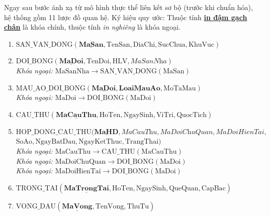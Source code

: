 Ngay sau bước ánh xạ từ mô hình thực thể liên kết sơ bộ (trước khi chuẩn hóa), hệ thống gồm 11 lược đồ quan hệ. Ký hiệu quy ước: Thuộc tính \underline{\textbf{in đậm gạch chân}} là khóa chính, thuộc tính \textit{in nghiêng} là khóa ngoại.

\begin{enumerate}
    \item $\text{SAN\_VAN\_DONG}(\underline{\mathbf{MaSan}}, \text{TenSan}, \text{DiaChi}, \text{SucChua}, \text{KhuVuc})$
    
    \item $\text{DOI\_BONG}(\underline{\mathbf{MaDoi}}, \text{TenDoi}, \text{HLV}, \textit{MaSanNha})$\\
    \textit{Khóa ngoại: $\text{MaSanNha} \rightarrow \text{SAN\_VAN\_DONG}(\text{MaSan})$}
    
    \item $\text{MAU\_AO\_DOI\_BONG}(\underline{\mathbf{MaDoi}}, \underline{\mathbf{LoaiMauAo}}, \text{MoTaMau})$\\
    \textit{Khóa ngoại: $\text{MaDoi} \rightarrow \text{DOI\_BONG}(\text{MaDoi})$}
    
    \item $\text{CAU\_THU}(\underline{\mathbf{MaCauThu}}, \text{HoTen}, \text{NgaySinh}, \text{ViTri}, \text{QuocTich})$
    
    \item $\text{HOP\_DONG\_CAU\_THU}(\underline{\mathbf{MaHD}}, \textit{MaCauThu}, \textit{MaDoiChuQuan}, \textit{MaDoiHienTai},$ \\
    $\text{SoAo}, \text{NgayBatDau}, \text{NgayKetThuc}, \text{TrangThai})$\\
    \textit{Khóa ngoại: $\text{MaCauThu} \rightarrow \text{CAU\_THU}(\text{MaCauThu})$}\\
    \textit{Khóa ngoại: $\text{MaDoiChuQuan} \rightarrow \text{DOI\_BONG}(\text{MaDoi})$}\\
    \textit{Khóa ngoại: $\text{MaDoiHienTai} \rightarrow \text{DOI\_BONG}(\text{MaDoi})$}
    
    \item $\text{TRONG\_TAI}(\underline{\mathbf{MaTrongTai}}, \text{HoTen}, \text{NgaySinh}, \text{QueQuan}, \text{CapBac})$
    
    \item $\text{VONG\_DAU}(\underline{\mathbf{MaVong}}, \text{TenVong}, \text{ThuTu})$
    

\end{enumerate}

